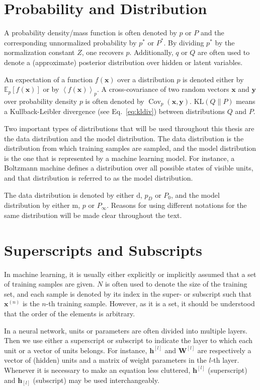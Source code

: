 \documentclass{now}
\newcommand{\qlay}[1]{\left[#1\right]}
\newcommand{\vect}[1]{\mathbf{#1}}
\newcommand{\matr}[1]{\mathbf{#1}}
\newcommand{\cov}[0]{\operatorname{Cov}}
\newcommand{\vh}[0]{\vect{h}}
\newcommand{\vx}[0]{\vect{x}}
\newcommand{\vy}[0]{\vect{y}}
\newcommand{\mW}[0]{\matr{W}}
\newcommand{\td}[0]{\text{d}}
\newcommand{\tf}[0]{\text{m}}
\newcommand{\KL}[0]{\text{KL}}
\newcommand{\E}[0]{\mathbb{E}}
\begin{document}
\section*{Probability and Distribution}

A probability density/mass function is often denoted by $p$ or $P$ and the
corresponding unnormalized probability by $p^*$ or $P^*$.  By dividing $p^*$ by
the normalization constant $Z$, one recovers $p$. Additionally, $q$ or $Q$ are
often used to denote a (approximate) posterior distribution over hidden or
latent variables. 

An expectation of a function $f(\vx)$ over a distribution $p$ is denoted either
by $\E_p\left[ f(\vx) \right]$ or by $\left< f(\vx) \right>_p$. A
cross-covariance of two random vectors $\vx$ and $\vy$ over probability density
$p$ is often denoted by $\cov_p(\vx, \vy)$. $\KL\left( Q \| P \right)$ means a
Kullback-Leibler divergence (see Eq.~\eqref{eq:kldiv}) between distributions
$Q$ and $P$.

Two important types of distributions that will be used throughout this thesis
are the data distribution and the model distribution.  The data distribution is
the distribution from which training samples are sampled, and the model
distribution is the one that is represented by a machine learning model. For
instance, a Boltzmann machine defines a distribution over all possible states
of visible units, and that distribution is referred to as the model
distribution.

The data distribution is denoted by either $\td$, $p_D$ or $P_0$, and the model
distribution by either $\tf$, $p$ or $P_\infty$.  Reasons for using different
notations for the same distribution will be made clear throughout the text.


\section*{Superscripts and Subscripts}

In machine learning, it is usually either explicitly or implicitly assumed that
a set of training samples are given. $N$ is often used to denote the size of
the training set, and each sample is denoted by its index in the super- or
subscript such that $\vx^{(n)}$ is the $n$-th training sample. However, as it
is a set, it should be understood that the order of the elements is
arbitrary.

In a neural network, units or parameters are often divided into multiple
layers. Then we use either a superscript or subscript to indicate the layer to
which each unit or a vector of units belongs. For instance, $\vh^{\qlay{l}}$
and $\mW^{\qlay{l}}$ are respectively a vector of (hidden) units and a matrix
of weight parameters in the $l$-th layer.  Whenever it is necessary to make an
equation less cluttered, $\vh^{\qlay{l}}$ (superscript) and $\vh_{\qlay{l}}$
(subscript) may be used interchangeably.
\end{document}

